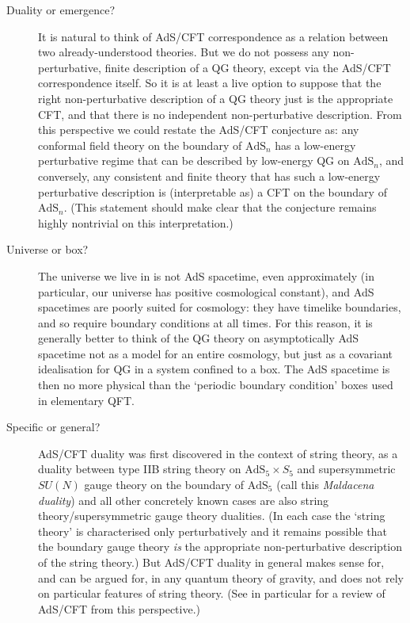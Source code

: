 \documentclass[12pt]{article}
\newcommand{\AdS}{\mathrm{AdS}}
\begin{document}
\begin{description}
\item[Duality or emergence?] It is natural to think of AdS/CFT correspondence as a relation between two already-understood theories. But we do not possess any non-perturbative, finite description of a QG theory, except via the AdS/CFT correspondence itself. So it is at least a live option to suppose that the right non-perturbative description of a QG theory just is the appropriate CFT, and that there is no independent non-perturbative description. From this perspective we could restate the AdS/CFT conjecture as: any conformal field theory on the boundary of $\AdS_n$ has a low-energy perturbative regime that can be described by low-energy QG on $\AdS_n$, and conversely, any consistent and finite theory that has such a low-energy perturbative description is (interpretable as) a CFT on the boundary of $\AdS_n$. (This statement should make clear that the conjecture remains highly nontrivial on this interpretation.)
\item[Universe or box?] The universe we live in is not AdS spacetime, even approximately (in particular, our universe has positive cosmological constant), and AdS spacetimes are poorly suited for cosmology: they have timelike boundaries, and so require boundary conditions at all times. For this reason, it is generally better to think of the QG theory on asymptotically AdS spacetime not as a model for an entire cosmology, but just as a covariant idealisation for QG in a system confined to a box. The AdS spacetime is then no more physical than the `periodic boundary condition' boxes used in elementary QFT.
\item[Specific or general?] AdS/CFT duality was first discovered  in the context of string theory, as a duality between type IIB string theory on $\AdS_5 \times S_5$ and supersymmetric $SU(N)$ gauge theory on the boundary of $\AdS_5$ (call this \emph{Maldacena duality}) and  all other concretely known cases are also string theory/supersymmetric gauge theory dualities. (In each case the `string theory' is characterised only perturbatively and it remains possible that the boundary gauge theory \emph{is} the appropriate non-perturbative description of the string theory.) But AdS/CFT duality in general makes sense for, and can be argued for, in any quantum theory of gravity, and does not rely on particular features of string theory. (See in particular  for a review of AdS/CFT from this perspective.)
\end{description}
\end{document}
